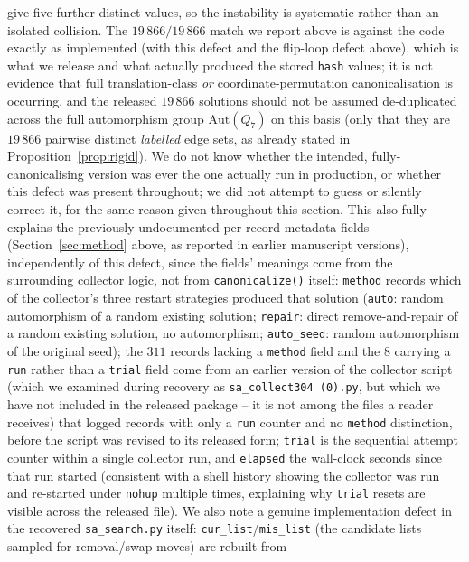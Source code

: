 \documentclass[12pt,a4paper]{article}
\theoremstyle{definition}
\begin{document}
give five further distinct values, so the instability is systematic
rather than an isolated collision. The $19\,866/19\,866$ match we
report above is against the code exactly as implemented (with this
defect and the flip-loop defect above), which is what we release and
what actually produced the
stored \texttt{hash} values; it is not evidence that full
translation-class \emph{or} coordinate-permutation canonicalisation is
occurring, and the released
$19\,866$ solutions should not be assumed de-duplicated across the
full automorphism group $\mathrm{Aut}(Q_7)$ on this basis (only that
they are $19\,866$ pairwise distinct \emph{labelled} edge sets, as
already stated in Proposition~\ref{prop:rigid}). We do not know
whether the intended, fully-canonicalising version was ever the one
actually run in production, or whether this defect was present
throughout; we did not attempt to guess or silently correct it, for
the same reason given throughout this section. This also fully explains the
previously undocumented per-record metadata fields
(Section~\ref{sec:method} above, as reported in earlier manuscript
versions), independently of this defect, since the fields' meanings
come from the surrounding collector logic, not from
\texttt{canonicalize()} itself: \texttt{method} records which of the collector's three
restart strategies produced that solution (\texttt{auto}: random
automorphism of a random existing solution; \texttt{repair}: direct
remove-and-repair of a random existing solution, no automorphism;
\texttt{auto\_seed}: random automorphism of the original seed); the
$311$ records lacking a \texttt{method} field and the $8$ carrying a
\texttt{run} rather than a \texttt{trial} field come from an earlier
version of the collector script (which we examined during recovery as
\texttt{sa\_collect304~(0).py}, but which we have not included in the
released package -- it is not among the files a reader receives) that
logged
records with only a \texttt{run} counter and no \texttt{method}
distinction, before the script was revised to its released form;
\texttt{trial} is the sequential attempt counter within a single
collector run, and \texttt{elapsed} the wall-clock seconds since that
run started (consistent with a shell history showing the collector
was run and re-started under \texttt{nohup} multiple times, explaining
why \texttt{trial} resets are visible across the released file). We
also note a genuine implementation defect in the recovered
\texttt{sa\_search.py} itself: \texttt{cur\_list}/\texttt{mis\_list}
(the candidate lists sampled for removal/swap moves) are rebuilt from
\end{document}
